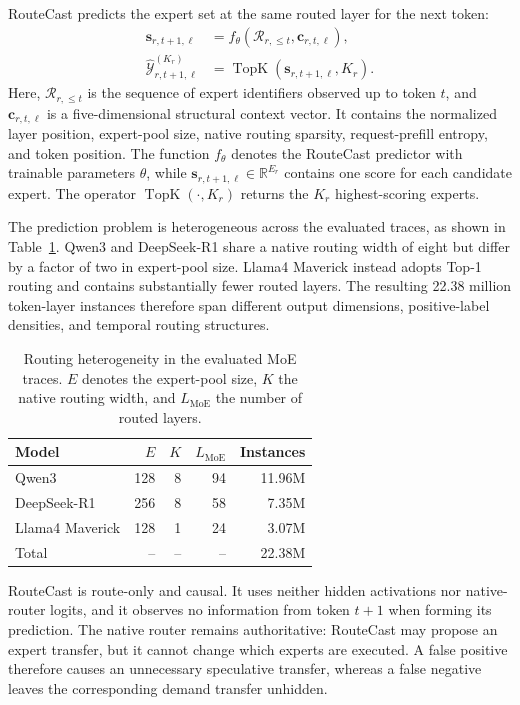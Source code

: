 \documentclass[conference]{IEEEtran}
\begin{document}
RouteCast predicts the expert set at the same routed layer for the next token:
\begin{align}
\mathbf{s}_{r,t+1,\ell}
&=
f_{\theta}\!\left(
\mathcal{R}_{r,\leq t},
\mathbf{c}_{r,t,\ell}
\right), \\
\widehat{\mathcal{Y}}_{r,t+1,\ell}^{(K_r)}
&=
\operatorname{TopK}\!\left(
\mathbf{s}_{r,t+1,\ell},K_r
\right).
\label{eq:task}
\end{align}
Here, $\mathcal{R}_{r,\leq t}$ is the sequence of expert identifiers observed
up to token $t$, and $\mathbf{c}_{r,t,\ell}$ is a five-dimensional structural
context vector. It contains the normalized layer position, expert-pool size,
native routing sparsity, request-prefill entropy, and token position. The
function $f_{\theta}$ denotes the RouteCast predictor with trainable parameters
$\theta$, while $\mathbf{s}_{r,t+1,\ell}\in\mathbb{R}^{E_r}$ contains one
score for each candidate expert. The operator
$\operatorname{TopK}(\cdot,K_r)$ returns the $K_r$ highest-scoring experts.

The prediction problem is heterogeneous across the evaluated traces, as shown
in Table~\ref{tab:route-regimes}. Qwen3 and DeepSeek-R1 share a native routing
width of eight but differ by a factor of two in expert-pool size. Llama4
Maverick instead adopts Top-1 routing and contains substantially fewer routed
layers. The resulting 22.38 million token-layer instances therefore span
different output dimensions, positive-label densities, and temporal routing
structures.

\begin{table}[!t]
\centering
\caption{Routing heterogeneity in the evaluated MoE traces. $E$ denotes the
expert-pool size, $K$ the native routing width, and $L_{\mathrm{MoE}}$ the
number of routed layers.}
\label{tab:route-regimes}
\scriptsize
\setlength{\tabcolsep}{3.2pt}
\begin{tabular}{lrrrr}
\toprule
Model & $E$ & $K$ & $L_{\mathrm{MoE}}$ & Instances \\
\midrule
Qwen3           & 128 & 8 & 94 & 11.96M \\
DeepSeek-R1     & 256 & 8 & 58 &  7.35M \\
Llama4 Maverick & 128 & 1 & 24 &  3.07M \\
\midrule
Total           & --  & -- & -- & 22.38M \\
\bottomrule
\end{tabular}
\end{table}

RouteCast is route-only and causal. It uses neither hidden activations nor
native-router logits, and it observes no information from token $t+1$ when
forming its prediction. The native router remains authoritative: RouteCast may
propose an expert transfer, but it cannot change which experts are executed. A
false positive therefore causes an unnecessary speculative transfer, whereas a
false negative leaves the corresponding demand transfer unhidden.
\end{document}
